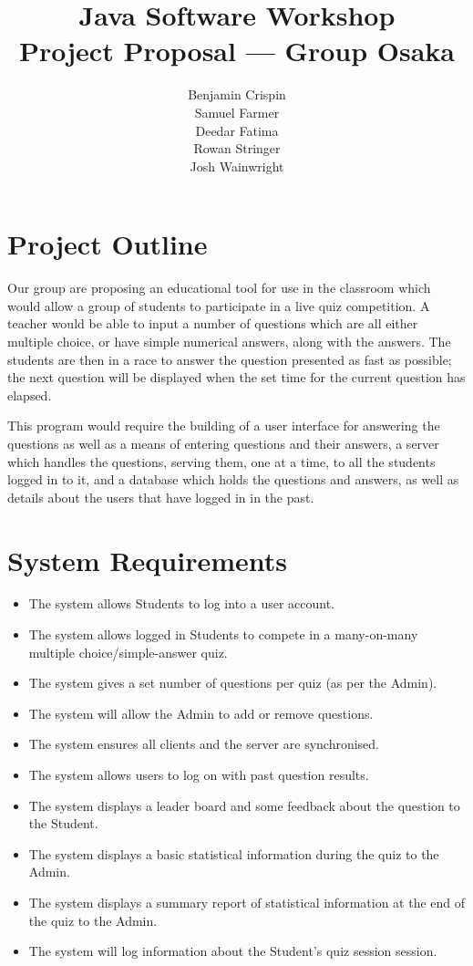 \documentclass[a4paper,10pt]{article}
\title{Java Software Workshop \\ Project Proposal --- Group Osaka}
\author{%
    Benjamin Crispin \\
    Samuel Farmer \\
    Deedar Fatima \\
    Rowan Stringer \\
    Josh Wainwright
}
\begin{document}
\maketitle

\section{Project Outline}
\label{sec:project_outline}

Our group are proposing an educational tool for use in the classroom which
would allow a group of students to participate in a live quiz competition. A
teacher would be able to input a number of questions which are all either
multiple choice, or have simple numerical answers, along with the answers. The
students are then in a race to answer the question presented as fast as
possible; the next question will be displayed when the set time for the current
question has elapsed.

This program would require the building of a user interface for answering the
questions as well as a means of entering questions and their answers, a server
which handles the questions, serving them, one at a time, to all the students
logged in to it, and a database which holds the questions and answers, as well
as details about the users that have logged in in the past.

\section{System Requirements}
\label{sec:system_requirements}

\begin{itemize}
	\item The system allows Students to log into a user account.
	\item The system allows logged in Students to compete in a many-on-many
		multiple choice/simple-answer quiz.
	\item The system gives a set number of questions per quiz (as per the
		Admin).
	\item The system will allow the Admin to add or remove questions.
	\item The system ensures all clients and the server are synchronised.
	\item The system allows users to log on with past question results.
	\item The system displays a leader board and some feedback about the
		question to the Student.
	\item The system displays a basic statistical information during the quiz
		to the Admin.
	\item The system displays a summary report of statistical information at
		the end of the quiz to the Admin.
	\item The system will log information about the Student's quiz session
		session.
\end{itemize}
\end{document}
